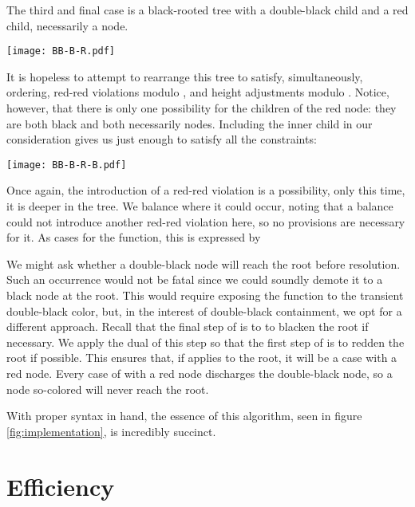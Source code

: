 \documentclass[preprint]{sigplanconf}
\begin{document}
The third and final case is a black-rooted tree with a double-black child and a red child, necessarily a node.
\begin{center}
\texttt{[image: BB-B-R.pdf]}
\end{center}
It is hopeless to attempt to rearrange this tree to satisfy, simultaneously, ordering, red-red violations modulo , and height adjustments modulo . Notice, however, that there is only one possibility for the children of the red node: they are both black and both necessarily nodes. Including the inner child in our consideration gives us just enough to satisfy all the constraints:
\begin{center}
\texttt{[image: BB-B-R-B.pdf]}
\end{center}
Once again, the introduction of a red-red violation is a possibility, only this time, it is deeper in the tree. We balance where it could occur, noting that a balance could not introduce another red-red violation here, so no provisions are necessary for it. As cases for the  function, this is expressed by
\begin{schemedisplay}
[(B (BB? a-w-b) x (R (B c y d) z e))
 (B (balance (B (R (-B a-w-b) x c) y d)) z e)]
[(B (R a w (B b x c)) y (BB? d-z-e))
 (B a w (balance (B b x (R c y (-B d-z-e)))))]
\end{schemedisplay}

We might ask whether a double-black node will reach the root before resolution. Such an occurrence would not be fatal since we could soundly demote it to a black node at the root. This would require exposing the  function to the transient double-black color, but, in the interest of double-black containment, we opt for a different approach. Recall that the final step of  is to to blacken the root if necessary. We apply the dual of this step so that the first step of  is to redden the root if possible. This ensures that, if  applies to the root, it will be a case with a red node. Every case of  with a red node discharges the double-black node, so a node so-colored will never reach the root.

With proper syntax in hand, the essence of this algorithm, seen in figure \ref{fig:implementation}, is incredibly succinct.

\section{Efficiency}
\end{document}
